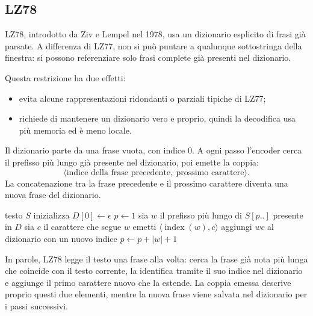 \documentclass{article}
\theoremstyle{definition}
\numberwithin{equation}{section}
\begin{document}
\subsection{LZ78}
LZ78, introdotto da Ziv e Lempel nel 1978, usa un dizionario esplicito di frasi già parsate. A differenza di LZ77, non si può puntare a qualunque sottostringa della finestra: si possono referenziare solo frasi complete già presenti nel dizionario.

Questa restrizione ha due effetti:
\begin{itemize}
    \item evita alcune rappresentazioni ridondanti o parziali tipiche di LZ77;
    \item richiede di mantenere un dizionario vero e proprio, quindi la decodifica usa più memoria ed è meno locale.
\end{itemize}

Il dizionario parte da una frase vuota, con indice $0$. A ogni passo l'encoder cerca il prefisso più lungo già presente nel dizionario, poi emette la coppia:
\[
    \langle \text{indice della frase precedente},\ \text{prossimo carattere}\rangle.
\]
La concatenazione tra la frase precedente e il prossimo carattere diventa una nuova frase del dizionario.

\begin{algorithm}[htpb]
    \caption{Schema di codifica LZ78}
    \begin{algorithmic}[1]
        \Require testo $S$
        \State inizializza $D[0]\gets \epsilon$
        \State $p\gets 1$
        \State sia $w$ il prefisso più lungo di $S[p..]$ presente in $D$
        \State sia $c$ il carattere che segue $w$
        \State emetti $\langle \operatorname{index}(w),c\rangle$
        \State aggiungi $wc$ al dizionario con un nuovo indice
        \State $p\gets p+|w|+1$
        \EndWhile
    \end{algorithmic}
    \label{alg:lz78_encoding}
\end{algorithm}

In parole, LZ78 legge il testo una frase alla volta: cerca la frase già nota più lunga che coincide con il testo corrente, la identifica tramite il suo indice nel dizionario e aggiunge il primo carattere nuovo che la estende. La coppia emessa descrive proprio questi due elementi, mentre la nuova frase viene salvata nel dizionario per i passi successivi.
\end{document}
